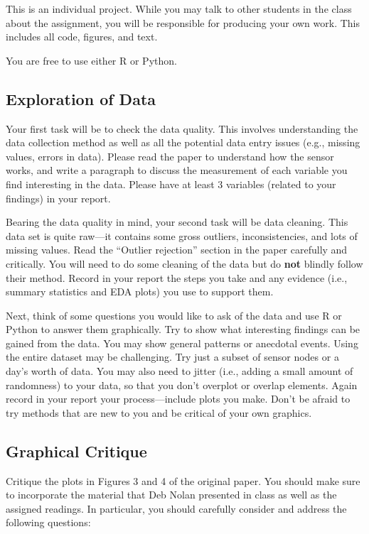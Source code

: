 \documentclass[11pt, oneside]{article}   	%
\begin{document}
This is an individual project.  While you may talk to other students in the
class about the assignment, you will be responsible for producing your own
work.  This includes all code, figures, and text.

You are free to use either R or Python.

\subsection*{Exploration of Data}

Your first task will be to check the data quality.  This involves understanding
the data collection method as well as all the potential data entry issues
(e.g., missing values, errors in data). Please read the paper to understand how
the sensor works, and write a paragraph to discuss the measurement of each
variable you find interesting in the data.  Please have at least 3 variables
(related to your findings) in your report.

Bearing the data quality in mind, your second task will be data cleaning. This
data set is quite raw---it contains some gross outliers, inconsistencies, and
lots of missing values. Read the ``Outlier rejection'' section in the paper
carefully and critically.  You will need to do some cleaning of the data but do
\textbf{not} blindly follow their method. Record in your report the steps you
take and any evidence (i.e., summary statistics and EDA plots) you use to
support them.

Next, think of some questions you would like to ask of the data and use R or
Python to answer them graphically. Try to show what interesting findings can be
gained from the data. You may show general patterns or anecdotal events.  Using
the entire dataset may be challenging. Try just a subset of sensor nodes or a
day's worth of data. You may also need to jitter (i.e., adding a small amount
of randomness) to your data, so that you don't overplot or overlap elements.
Again record in your report your process---include plots you make. Don't be
afraid to try methods that are new to you and be critical of your own graphics.

\subsection*{Graphical Critique}

Critique the plots in Figures 3 and 4 of the original paper. You should
make sure to incorporate the material that Deb Nolan presented in class as well
as the assigned readings.  In particular, you should carefully consider and
address the following questions:
\end{document}
